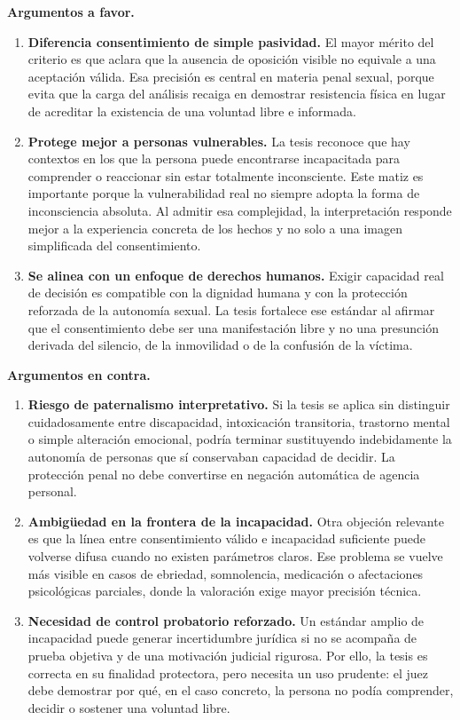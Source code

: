 \documentclass[
	spanish,
	letterpaper, oneside
]{article}
\begin{document}
\textbf{Argumentos a favor.}
\begin{enumerate}
	\item \textbf{Diferencia consentimiento de simple pasividad.} El mayor mérito del criterio es que aclara que la ausencia de oposición visible no equivale a una aceptación válida. Esa precisión es central en materia penal sexual, porque evita que la carga del análisis recaiga en demostrar resistencia física en lugar de acreditar la existencia de una voluntad libre e informada.
	\item \textbf{Protege mejor a personas vulnerables.} La tesis reconoce que hay contextos en los que la persona puede encontrarse incapacitada para comprender o reaccionar sin estar totalmente inconsciente. Este matiz es importante porque la vulnerabilidad real no siempre adopta la forma de inconsciencia absoluta. Al admitir esa complejidad, la interpretación responde mejor a la experiencia concreta de los hechos y no solo a una imagen simplificada del consentimiento.
	\item \textbf{Se alinea con un enfoque de derechos humanos.} Exigir capacidad real de decisión es compatible con la dignidad humana y con la protección reforzada de la autonomía sexual. La tesis fortalece ese estándar al afirmar que el consentimiento debe ser una manifestación libre y no una presunción derivada del silencio, de la inmovilidad o de la confusión de la víctima.
\end{enumerate}

\textbf{Argumentos en contra.}
\begin{enumerate}
	\item \textbf{Riesgo de paternalismo interpretativo.} Si la tesis se aplica sin distinguir cuidadosamente entre discapacidad, intoxicación transitoria, trastorno mental o simple alteración emocional, podría terminar sustituyendo indebidamente la autonomía de personas que sí conservaban capacidad de decidir. La protección penal no debe convertirse en negación automática de agencia personal.
	\item \textbf{Ambigüedad en la frontera de la incapacidad.} Otra objeción relevante es que la línea entre consentimiento válido e incapacidad suficiente puede volverse difusa cuando no existen parámetros claros. Ese problema se vuelve más visible en casos de ebriedad, somnolencia, medicación o afectaciones psicológicas parciales, donde la valoración exige mayor precisión técnica.
	\item \textbf{Necesidad de control probatorio reforzado.} Un estándar amplio de incapacidad puede generar incertidumbre jurídica si no se acompaña de prueba objetiva y de una motivación judicial rigurosa. Por ello, la tesis es correcta en su finalidad protectora, pero necesita un uso prudente: el juez debe demostrar por qué, en el caso concreto, la persona no podía comprender, decidir o sostener una voluntad libre.
\end{enumerate}
\end{document}
